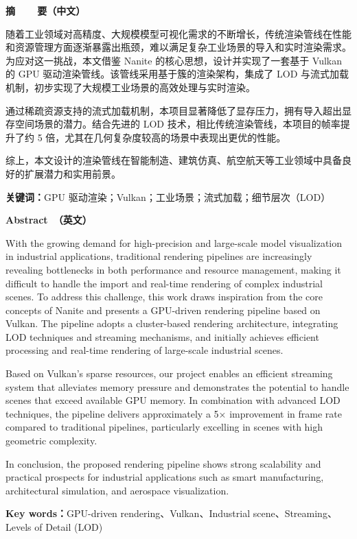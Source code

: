 \cleardoublepage{}

\vspace*{-2em}

\begin{center}
    \bfseries {} 摘~~~~要（中文）
\end{center}

随着工业领域对高精度、大规模模型可视化需求的不断增长，传统渲染管线在性能和资源管理方面逐渐暴露出瓶颈，难以满足复杂工业场景的导入和实时渲染需求。为应对这一挑战，本文借鉴 Nanite 的核心思想，设计并实现了一套基于 Vulkan 的 GPU 驱动渲染管线。该管线采用基于簇的渲染架构，集成了 LOD 与流式加载机制，初步实现了大规模工业场景的高效处理与实时渲染。

通过稀疏资源支持的流式加载机制，本项目显著降低了显存压力，拥有导入超出显存空间场景的潜力。结合先进的 LOD 技术，相比传统渲染管线，本项目的帧率提升了约 5 倍，尤其在几何复杂度较高的场景中表现出更优的性能。

综上，本文设计的渲染管线在智能制造、建筑仿真、航空航天等工业领域中具备良好的扩展潜力和实用前景。

\vspace{1em}

\noindent\textbf{关键词：}GPU 驱动渲染；Vulkan；工业场景；流式加载；细节层次（LOD）

\cleardoublepage{}

\vspace*{-2em}

\begin{center}
    \bfseries {} Abstract~（英文）
\end{center}

With the growing demand for high-precision and large-scale model visualization in industrial applications, traditional rendering pipelines are increasingly revealing bottlenecks in both performance and resource management, making it difficult to handle the import and real-time rendering of complex industrial scenes. To address this challenge, this work draws inspiration from the core concepts of Nanite and presents a GPU-driven rendering pipeline based on Vulkan. The pipeline adopts a cluster-based rendering architecture, integrating LOD techniques and streaming mechanisms, and initially achieves efficient processing and real-time rendering of large-scale industrial scenes.

Based on Vulkan's sparse resources, our project enables an efficient streaming system that alleviates memory pressure and demonstrates the potential to handle scenes that exceed available GPU memory. In combination with advanced LOD techniques, the pipeline delivers approximately a 5× improvement in frame rate compared to traditional pipelines, particularly excelling in scenes with high geometric complexity.

In conclusion, the proposed rendering pipeline shows strong scalability and practical prospects for industrial applications such as smart manufacturing, architectural simulation, and aerospace visualization.

\vspace{1em}

\noindent\textbf{Key words：}GPU-driven rendering、Vulkan、Industrial scene、Streaming、Levels of Detail (LOD)